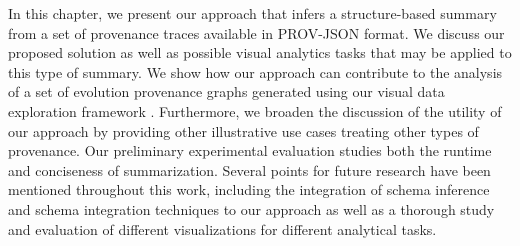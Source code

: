 In this chapter, we present our approach that infers a structure-based summary from a set of provenance traces available in PROV-JSON format.
We discuss our proposed solution as well as possible visual analytics tasks that may be applied to this type of summary. 
We show how our approach can contribute to the analysis of a set of evolution provenance graphs generated using our visual data exploration framework \framework{}. Furthermore, we broaden the discussion of the utility of our approach by providing other illustrative use cases treating other types of provenance.
Our preliminary experimental evaluation studies both the runtime and conciseness of summarization. Several points for future research have been mentioned throughout this work, including the integration of schema inference and schema integration techniques to our approach as well as a thorough study and evaluation of different visualizations for different analytical tasks.